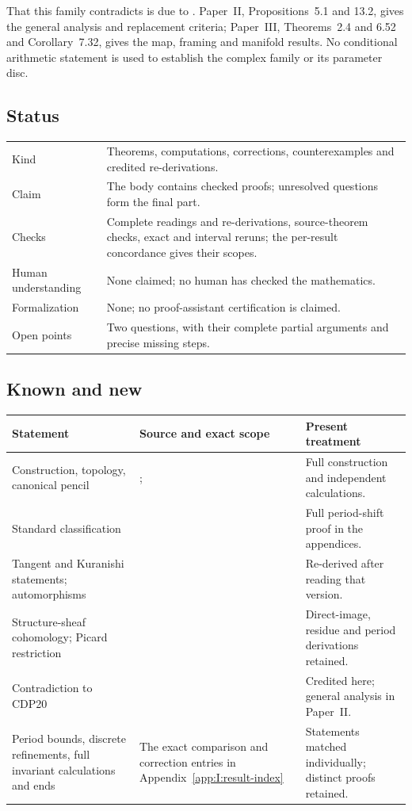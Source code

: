 That this family contradicts \citet[Corollary~2.3]{CDP20} is due to
\citet[Section~1.2 and Theorem~10.5]{AC2026}. Paper~II, Propositions~5.1 and 13.2, gives the general analysis and replacement criteria; Paper~III, Theorems~2.4 and 6.52 and Corollary~7.32, gives the map, framing and manifold results. No conditional arithmetic statement is used
to establish the complex family or its parameter disc.

\subsection{Status}
\begin{tabular}{@{}p{30mm}p{121mm}@{}}
\toprule
Kind & Theorems, computations, corrections, counterexamples and credited re-derivations.\\
Claim & The body contains checked proofs; unresolved questions form the final part.\\
Checks & Complete readings and re-derivations, source-theorem checks, exact and interval reruns; the per-result concordance gives their scopes.\\
Human understanding & None claimed; no human has checked the mathematics.\\
Formalization & None; no proof-assistant certification is claimed.\\
Open points & Two questions, with their complete partial arguments and precise missing steps.\\
\bottomrule
\end{tabular}

\subsection{Known and new}
\begin{tabular}{@{}p{41mm}p{70mm}p{38mm}@{}}
\toprule
Statement & Source and exact scope & Present treatment\\
\midrule
Construction, topology, canonical pencil &
\citet[Main Theorem; Sections~3--7; Theorem~9.1]{AC2026};
\citet[main theorem]{Engel2026} & Full construction and independent calculations.\\
Standard classification &
\citet[Theorem~1.4]{DuEtAl2026v1} & Full period-shift proof in the appendices.\\
Tangent and Kuranishi statements; automorphisms &
\citet[Theorem~1.4; Theorem~6.12; Proposition~6.16]{DuEtAl2026v1} & Re-derived after reading that version.\\
Structure-sheaf cohomology; Picard restriction &
\citet[Lemma~9.12; Proposition~9.13; Theorem~10.5]{AC2026} & Direct-image, residue and period derivations retained.\\
Contradiction to CDP20 &
\citet[Section~1.2; Theorem~10.5]{AC2026} & Credited here; general analysis in Paper~II.\\
Period bounds, discrete refinements, full invariant calculations and ends &
The exact comparison and correction entries in Appendix~\ref{app:I:result-index} & Statements matched individually; distinct proofs retained.\\
\bottomrule
\end{tabular}

